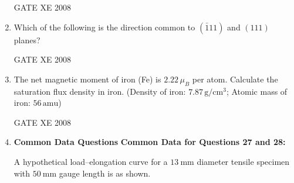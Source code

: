 \documentclass[12pt]{article}
\begin{document}
\begin{enumerate}[label=Q\arabic*.]
\begin{enumerate}[label=(\Alph*)]
\end{enumerate}

GATE XE 2008

\item Which of the following is the direction common to $(\bar{1}11)$ and $(111)$ planes?

\begin{enumerate}[label=(\Alph*)]
\end{enumerate}

GATE XE 2008

\item The net magnetic moment of iron (Fe) is $2.22 \, \mu_B$ per atom. Calculate the saturation flux density in iron. (Density of iron: $7.87 \, \mathrm{g/cm^3}$; Atomic mass of iron: $56 \, \mathrm{amu}$)

\begin{enumerate}[label=(\Alph*)]
\end{enumerate}

GATE XE 2008



\item[] \textbf{\Large Common Data Questions}
\textbf{Common Data for Questions 27 and 28:}

A hypothetical load–elongation curve for a $13 \ \mathrm{mm}$ diameter tensile specimen with $50 \ \mathrm{mm}$ gauge length is as shown.


\end{enumerate}
\end{document}
